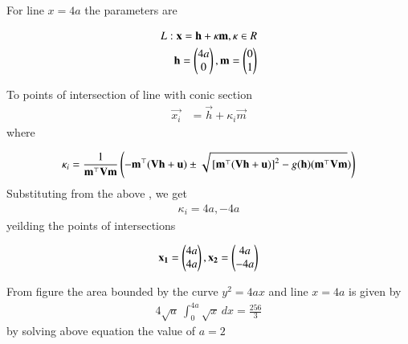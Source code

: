 \documentclass[journal]{IEEEtran}
\begin{document}
 For line $ x = 4a $ the parameters are

\begin{align}
	L : \mathbf{x} = \mathbf{h} +\kappa \mathbf{m} ,\kappa \in R\\
	\mathbf{h}=\begin{pmatrix}
		 4a \\	0 \end{pmatrix}, \mathbf{m} = \begin{pmatrix}0 \\1\end{pmatrix}
 \end{align}

 To  points of intersection of line with conic section
 \begin{align}
  \vec{x_i} &= \vec{h} + \kappa_i \vec{m}
\end{align}
where 


\begin{align}
	\kappa_i = \frac{1}{\mathbf{{m}^{\top}Vm }}\left(-\mathbf{{m}^{\top}(Vh+u)} \pm \sqrt{{}\left[\mathbf{m^{\top}(Vh+u)  }\right]^{2} - g(\mathbf{h})(\mathbf{{m}^{\top}Vm} })    \right)
\end{align}
Substituting from the above ,  we get 
\begin{align}        \kappa_i = 4a , -4a    \end{align}
yeilding the points of intersections

\begin{align}   
 \mathbf{x_1}= \begin{pmatrix}4a\\ 4a \end{pmatrix}    , \mathbf{x_2}= \begin{pmatrix}4a\\ -4a \end{pmatrix}   \end{align}
 
From figure the area bounded by the curve  $y^{2} = 4ax$ and line $x = 4a$ is given by 
\begin{align}
	4\sqrt{a}\ \int_{0}^{4a}  \sqrt{x} \,dx = \frac{256}{3}
\end{align}
by solving above equation the value of $a = 2 $ 
\end{document}
